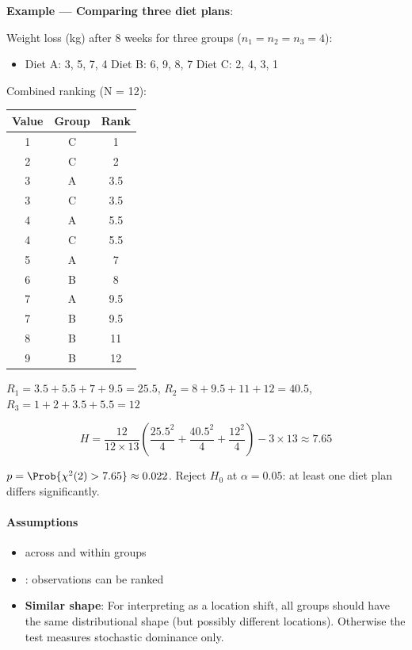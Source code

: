 \textbf{Example — Comparing three diet plans}:

Weight loss (kg) after 8 weeks for three groups ($n_1 = n_2 = n_3 = 4$):
\begin{itemize}
    \item Diet A: 3, 5, 7, 4 \quad Diet B: 6, 9, 8, 7 \quad Diet C: 2, 4, 3, 1
\end{itemize}

Combined ranking (N = 12):

\begin{center}
\begin{tabular}{|c|c|c|}
    \hline
    \textbf{Value} & \textbf{Group} & \textbf{Rank} \\
    \hline
    1 & C & 1 \\ 2 & C & 2 \\ 3 & A & 3.5 \\ 3 & C & 3.5 \\
    4 & A & 5.5 \\ 4 & C & 5.5 \\ 5 & A & 7 \\ 6 & B & 8 \\
    7 & A & 9.5 \\ 7 & B & 9.5 \\ 8 & B & 11 \\ 9 & B & 12 \\
    \hline
\end{tabular}
\end{center}

$R_1 = 3.5+5.5+7+9.5 = 25.5$, \quad $R_2 = 8+9.5+11+12 = 40.5$, \quad $R_3 = 1+2+3.5+5.5 = 12$

$$H = \frac{12}{12 \times 13}\left(\frac{25.5^2}{4} + \frac{40.5^2}{4} + \frac{12^2}{4}\right) - 3 \times 13 \approx 7.65$$

$p = \Prob{\chi^2(2) > 7.65} \approx 0.022$. Reject $H_0$ at $\alpha = 0.05$: at least one
diet plan differs significantly.

\paragraph{Assumptions}
\begin{itemize}
    \item {} across and within groups
    \item {}: observations can be ranked
    \item \textbf{Similar shape}: For interpreting as a location shift, all groups should
        have the same distributional shape (but possibly different locations). Otherwise
        the test measures stochastic dominance only.
\end{itemize}

